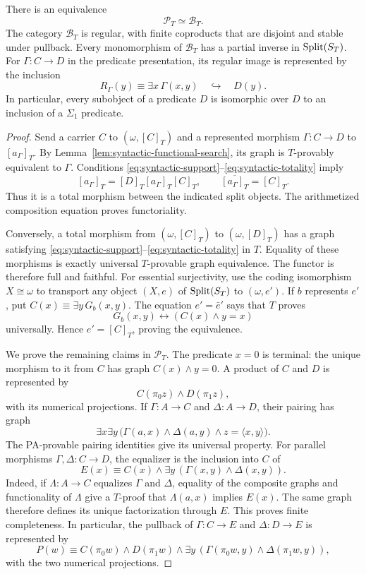 \begin{lemma}\label{lem:syntactic-total-category}
There is an equivalence
\[
 \mathcal P_T\simeq\mathcal B_T.
\]
The category $\mathcal B_T$ is regular, with finite coproducts
that are disjoint and stable under pullback. Every monomorphism
of $\mathcal B_T$ has a partial inverse in $\operatorname{Split}(S_T)$.
For $\Gamma:C\to D$ in the predicate presentation, its regular
image is represented by the inclusion
\[
 R_\Gamma(y)\equiv\exists x\,\Gamma(x,y)
 \quad\hookrightarrow\quad D(y).
\]
In particular, every subobject of a predicate $D$ is isomorphic
over $D$ to an inclusion of a $\Sigma_1$ predicate.
\end{lemma}
\begin{proof}
Send a carrier $C$ to $(\omega,[C]_T)$ and a represented morphism
$\Gamma:C\to D$ to $[a_\Gamma]_T$. By
Lemma~\ref{lem:syntactic-functional-search}, its graph is
$T$-provably equivalent to $\Gamma$. Conditions
\eqref{eq:syntactic-support}--\eqref{eq:syntactic-totality} imply
\[
 [a_\Gamma]_T=[D]_T[a_\Gamma]_T[C]_T,
 \qquad\overline{[a_\Gamma]_T}=[C]_T.
\]
Thus it is a total morphism between the indicated split objects.
The arithmetized composition equation proves functoriality.

Conversely, a total morphism from $(\omega,[C]_T)$ to
$(\omega,[D]_T)$ has a graph satisfying
\eqref{eq:syntactic-support}--\eqref{eq:syntactic-totality} in $T$.
Equality of these morphisms is exactly universal $T$-provable graph
equivalence. The functor is therefore full and faithful.
For essential surjectivity, use the coding isomorphism $X\cong\omega$
to transport any object $(X,e)$ of $\operatorname{Split}(S_T)$ to $(\omega,e')$.
If $b$ represents $e'$, put $C(x)\equiv\exists y\,G_b(x,y)$.
The equation $e'=\bar e'$ says that $T$ proves
\[
 G_b(x,y)\longleftrightarrow(C(x)\land y=x)
\]
universally. Hence $e'=[C]_T$, proving the equivalence.

We prove the remaining claims in $\mathcal P_T$.
The predicate $x=0$ is terminal: the unique morphism to it from
$C$ has graph $C(x)\land y=0$.
A product of $C$ and $D$ is represented by
\[
 C(\pi_0z)\land D(\pi_1z),
\]
with its numerical projections. If $\Gamma:A\to C$ and
$\Delta:A\to D$, their pairing has graph
\[
 \exists x\exists y\,
   \bigl(\Gamma(a,x)\land\Delta(a,y)\land z=\langle x,y\rangle\bigr).
\]
The PA-provable pairing identities give its universal property.
For parallel morphisms $\Gamma,\Delta:C\to D$, the equalizer is
the inclusion into $C$ of
\[
 E(x)\equiv C(x)\land
             \exists y\,(\Gamma(x,y)\land\Delta(x,y)).
\]
Indeed, if $\Lambda:A\to C$ equalizes $\Gamma$ and $\Delta$,
equality of the composite graphs and functionality of $\Lambda$
give a $T$-proof that $\Lambda(a,x)$ implies $E(x)$.
The same graph therefore defines its unique factorization through
$E$. This proves finite completeness. In particular, the pullback
of $\Gamma:C\to E$ and $\Delta:D\to E$ is represented by
\[
 P(w)\equiv C(\pi_0w)\land D(\pi_1w)\land
       \exists y\,(\Gamma(\pi_0w,y)\land\Delta(\pi_1w,y)),
\]
with the two numerical projections.


\end{proof}
